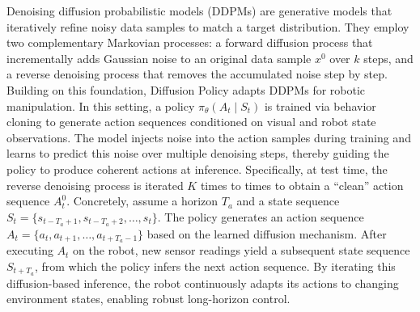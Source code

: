 Denoising diffusion probabilistic models (DDPMs) \cite{ho2020denoising} are generative models that iteratively refine noisy data samples to match a target distribution.  They employ two complementary Markovian processes: a forward diffusion process that incrementally adds Gaussian noise to an original data sample $x^0$ over $k$ steps, and a reverse denoising process that removes the accumulated noise step by step. Building on this foundation, Diffusion Policy \cite{chi2023diffusion} adapts DDPMs for robotic manipulation. In this setting, a policy $\pi_{\theta}(A_t \mid S_t)$ is trained via behavior cloning to generate action sequences conditioned on visual and robot state observations. The model injects noise into the action samples during training and learns to predict this noise over multiple denoising steps, thereby guiding the policy to produce coherent actions at inference. Specifically, at test time, the reverse denoising process is iterated $K$ times to times to obtain a ``clean'' action sequence $A^0_t$. Concretely, assume a horizon $T_a$ and a state sequence $S_t = \{ s_{t - T_a + 1}, s_{t - T_a + 2}, \ldots, s_t \}$. The policy generates an action sequence $A_t = \{ a_t, a_{t+1}, \ldots, a_{t + T_a - 1} \}$ based on the learned diffusion mechanism. After executing $A_t$ on the robot, new sensor readings yield a subsequent state sequence $S_{t + T_a}$, from which the policy infers the next action sequence. By iterating this diffusion-based inference, the robot continuously adapts its actions to changing environment states, enabling robust long-horizon control.